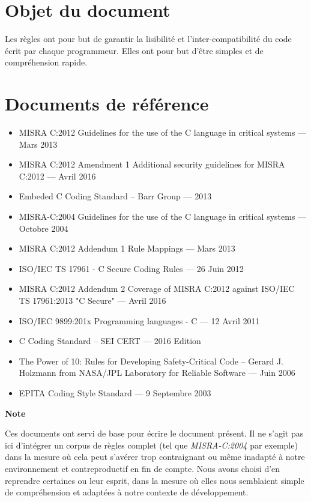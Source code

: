 \section{Objet du document}

Les règles ont pour but de garantir la lisibilité et l'inter-compatibilité du code écrit par chaque programmeur. Elles ont pour but d'être simples et de compréhension rapide.\bigskip

\section{Documents de référence}

\begin{itemize}
\item[\PencilRightDown] MISRA C:2012 Guidelines for the use of the C language in critical systems --- Mars 2013
\item[\PencilRightDown] MISRA C:2012 Amendment 1 Additional security guidelines for MISRA C:2012 --- Avril 2016
\item[\PencilRightDown] Embeded C Coding Standard -- Barr Group --- 2013
\item[\PencilRightDown] MISRA-C:2004 Guidelines for the use of the C language in critical systems --- Octobre 2004
\item[\PencilRightDown] MISRA C:2012 Addendum 1 Rule Mappings --- Mars 2013
\item[\PencilRightDown] ISO/IEC TS 17961 - C Secure Coding Rules --- 26 Juin 2012
\item[\PencilRightDown] MISRA C:2012 Addendum 2 Coverage of MISRA C:2012 against ISO/IEC TS 17961:2013 "C Secure" --- Avril 2016
\item[\PencilRightDown] ISO/IEC 9899:201x Programming languages - C --- 12 Avril 2011
\item[\PencilRightDown] C Coding Standard -- SEI CERT --- 2016 Edition
\item[\PencilRightDown] The Power of 10:
Rules for Developing Safety-Critical Code -- Gerard J. Holzmann from NASA/JPL Laboratory for Reliable Software --- Juin 2006
\item[\PencilRightDown] EPITA Coding Style Standard --- 9 Septembre 2003
\end{itemize}
\bigskip

\begin{large}
\textbf{Note}
\end{large}
\medskip

Ces documents ont servi de base pour écrire le document présent. Il ne s'agit pas ici d'intégrer un corpus de règles complet (tel que \textit{MISRA-C:2004} par exemple) dans la mesure où cela peut s'avérer trop contraignant ou même inadapté à notre environnement et contreproductif en fin de compte.
Nous avons choisi d'en reprendre certaines ou leur esprit, dans la mesure où elles nous semblaient simple de compréhension et adaptées à notre contexte de développement.

\pagebreak
